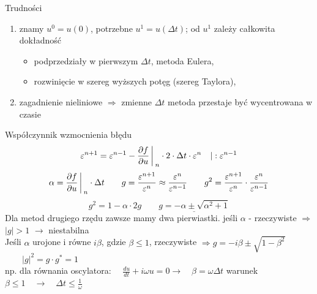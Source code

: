 \begin{frame}{Trudności}
	\begin{enumerate}
      \item znamy $u^0 = u(0)$, potrzebne $u^1 = u(\Delta t)$; od $u^1$ zależy całkowita dokładność
          \begin{itemize}
            \item podprzedziały w pierwszym $\Delta t$, metoda Eulera,
            \item rozwinięcie w szereg wyższych potęg (szereg Taylora),
          \end{itemize}
      \item zagadnienie nieliniowe $\Rightarrow$ zmienne $\Delta t$ \quad metoda przestaje być wycentrowana w czasie
    \end{enumerate}
\end{frame}
\begin{frame}{Współczynnik wzmocnienia błędu}
	$$\varepsilon^{n+1} = \varepsilon^{n-1} - \frac{\partial f}{\partial u} \bigg\arrowvert _n \cdot 2 \cdot \Delta t \cdot \varepsilon^n \quad \arrowvert :\varepsilon^{n-1}$$
    $$\alpha = \frac{\partial f}{\partial u}\bigg\arrowvert_n \cdot \Delta t \qquad g = \frac{\varepsilon^{n+1}}{\varepsilon^n} \approx \frac{\varepsilon^{n}}{\varepsilon^{n-1}} \qquad g^2=\frac{\varepsilon^{n+1}}{\varepsilon^n}\cdot \frac{\varepsilon^{n}}{\varepsilon^{n-1}}$$
    $$g^2 = 1- \alpha \cdot 2g \qquad \underline{g = -\alpha \pm \sqrt{\alpha^2+1}}$$
    Dla metod drugiego rzędu zawsze mamy dwa pierwiastki. \newline
    jeśli $\alpha$ - rzeczywiste $\Rightarrow$ \quad $|g| > 1$ \quad $\rightarrow$ niestabilna\\
    
    Jeśli  $\alpha$ urojone i równe $i\beta$, gdzie $\beta \leqslant 1$, rzeczywiste  
    $\Rightarrow g = -i\beta\pm\sqrt{1-\beta^2}$
    $\qquad |g|^2 = g \cdot g^* = 1 $\\
    np. dla równania oscylatora: $\quad \frac{du}{dt}+i\omega u = 0 \rightarrow \quad \beta = \omega\Delta t $ warunek $\beta \leqslant 1 \quad \rightarrow \quad \Delta t \leqslant\frac{1}{\omega}$
\end{frame}

